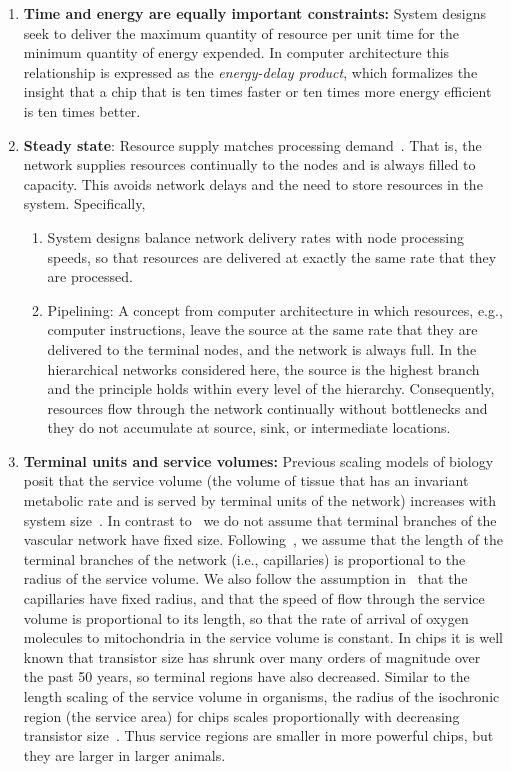\documentclass[12pt]{article}
\begin{document}
\begin{enumerate}
\item {\bf Time and energy are equally important constraints:} 
  System designs seek to deliver the maximum quantity of
  resource per unit time for the minimum quantity of energy expended. 
  In computer architecture this relationship is expressed as the
  \emph{energy-delay product}, which formalizes the insight that a
  chip that is ten times faster or ten times more energy efficient is
  ten times better. 

\item {\bf Steady state}: Resource supply matches processing
  demand~\cite{banavar10}.  That is, the network supplies resources continually
  to the nodes and is always filled to capacity.  This avoids network
  delays and the need to store resources in the system. Specifically,

  \begin{enumerate}

\item System designs balance network delivery rates with node processing
  speeds, so that resources are delivered at exactly the same rate that they
  are processed.

\item Pipelining: A concept from computer architecture in which resources,
  e.g., computer instructions, leave the source at the same rate that they are
  delivered to the terminal nodes, and the network is always full.  In the
  hierarchical networks considered here, the source is the highest branch
  and the principle holds within every level of the hierarchy.
  Consequently, resources flow through the network continually 
  without bottlenecks and they do not accumulate at source, sink, or intermediate locations.
  \end{enumerate}

\item {\bf Terminal units and service volumes:} Previous scaling models of biology posit that the service volume (the volume of tissue that has an invariant metabolic rate and is served by terminal units of the network) increases with
  system size~\cite{west97, banavar10}.  In contrast to~\cite{west97} we do not assume that terminal branches of the vascular network have fixed size. Following~\cite{banavar10}, we assume that the length of the terminal branches of the network (i.e., capillaries) is
  proportional to the radius of the service volume.  We also follow the assumption in~\cite{banavar10} that the capillaries have fixed radius, and that the speed of flow through the service volume is proportional to its length, so that the rate of arrival of oxygen molecules to mitochondria in the service volume is constant.   In
  chips it is well known that transistor size has shrunk over many orders of
  magnitude over the past 50 years, so terminal regions have also decreased. Similar to the length scaling of the service volume in organisms, the radius of the isochronic region (the service area) for chips scales proportionally with decreasing transistor size~\cite{moses08}. Thus service regions are smaller in more powerful chips, but they are larger in larger animals.
\end{enumerate}
\end{document}
